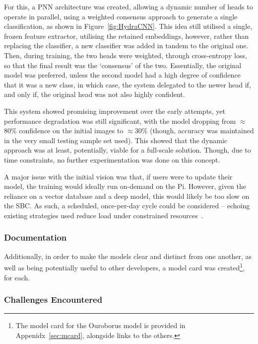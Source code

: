                For this, a PNN architecture was created, allowing a dynamic number of heads to operate in parallel, using a weighted consensus approach to generate a single classification, as shown in Figure~\ref{fig:HydraCNN}. This idea still utilised a single, frozen feature extractor, utilising the retained embeddings, however, rather than replacing the classifier, a new classifier was added in tandem to the original one. Then, during training, the two heads were weighted, through cross-entropy loss, so that the final result was the `consensus' of the two. Essentially, the original model was preferred, unless the second model had a high degree of confidence that it was a new class, in which case, the system delegated to the newer head if, and only if, the original head was not also highly confident.
    
                This system showed promising improvement over the early attempts, yet performance degradation was still significant, with the model dropping from $\approx$80\% confidence on the initial images to $\approx$30\% (though, accuracy was maintained in the very small testing sample set used). This showed that the dynamic approach was at least, potentially,  viable for a full-scale solution. Though, due to time constraints, no further experimentation was done on this concept.
    
                A major issue with the initial vision was that, if users were to update their model, the training would ideally run on-demand on the Pi. However, given the reliance on a vector database and a deep model, this would likely be too slow on the SBC. As such, a scheduled, once-per-day cycle could be considered -- echoing existing strategies used reduce load under constrained resources~\cite{gonzalez2019cernbox}.
    
            \subsubsection{Documentation}
    
                Additionally, in order to make the models clear and distinct from one another, as well as being potentially useful to other developers, a model card \cite{Mitchell_2019} was created\footnote{The model card for the Ouroborus model is provided in Appenidx~\ref{sec:mcard}, alongside links to the others.}, for each.
            
            \subsubsection{Challenges Encountered}
    
